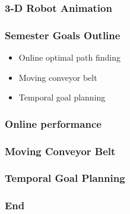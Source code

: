 \documentclass{beamer}
\begin{document}
\begin{frame}
\frametitle{3-D Robot Animation}

\end{frame}


\begin{frame}
\frametitle{Semester Goals Outline}
\begin{itemize}
\item Online optimal path finding
\item Moving conveyor belt
\item Temporal goal planning
\end{itemize}

\end{frame}


\begin{frame}
\frametitle{Online performance}

\end{frame}


\begin{frame}
\frametitle{Moving Conveyor Belt}

\end{frame}


\begin{frame}
\frametitle{Temporal Goal Planning}

\end{frame}

\begin{frame}
\frametitle{End}

\end{frame}
\end{document}
